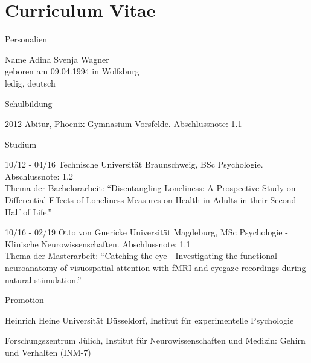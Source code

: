 
\chapter{Curriculum Vitae}


\begin{cv}{}
\begin{cvlist}{Personalien}
	\item[Name]
		Adina Svenja Wagner \\
		geboren am 09.04.1994 in Wolfsburg \\
		ledig, deutsch
\end{cvlist}
%
\begin{cvlist}{Schulbildung}
	\item[2012] Abitur, Phoenix Gymnasium Vorsfelde. Abschlussnote: 1.1
\end{cvlist}
%
\begin{cvlist}{Studium}
	\item[10/12 - 04/16] Technische Universität Braunschweig, BSc Psychologie. Abschlussnote: 1.2
	\\[0.5\baselineskip]
    Thema der Bachelorarbeit: \enquote{Disentangling Loneliness: A Prospective Study on Differential Effects of
	Loneliness Measures on Health in Adults in their Second Half of Life.}
	\item[10/16 - 02/19] Otto von Guericke Universität Magdeburg, MSc Psychologie - Klinische Neurowissenschaften. Abschlussnote: 1.1 
	\\[0.5\baselineskip]
	Thema der Masterarbeit: \enquote{Catching the eye - Investigating the functional neuroanatomy of visuospatial
	attention with fMRI and eyegaze recordings during natural stimulation.}
\end{cvlist}
%
\begin{cvlist}{Promotion}
	\item Heinrich Heine Universität Düsseldorf, Institut für experimentelle Psychologie
	\item Forschungszentrum Jülich, Institut für Neurowissenschaften und Medizin: Gehirn und Verhalten (INM-7)
\end{cvlist}

\end{cv}
